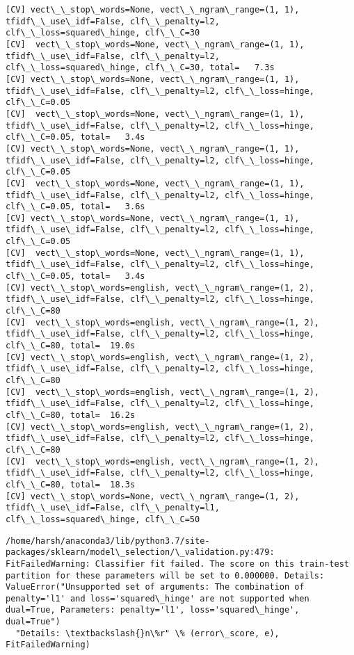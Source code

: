 \documentclass[11pt]{article}
\begin{document}
\begin{Verbatim}[commandchars=\\\{\}]
[CV] vect\_\_stop\_words=None, vect\_\_ngram\_range=(1, 1), tfidf\_\_use\_idf=False, clf\_\_penalty=l2, clf\_\_loss=squared\_hinge, clf\_\_C=30 
[CV]  vect\_\_stop\_words=None, vect\_\_ngram\_range=(1, 1), tfidf\_\_use\_idf=False, clf\_\_penalty=l2, clf\_\_loss=squared\_hinge, clf\_\_C=30, total=   7.3s
[CV] vect\_\_stop\_words=None, vect\_\_ngram\_range=(1, 1), tfidf\_\_use\_idf=False, clf\_\_penalty=l2, clf\_\_loss=hinge, clf\_\_C=0.05 
[CV]  vect\_\_stop\_words=None, vect\_\_ngram\_range=(1, 1), tfidf\_\_use\_idf=False, clf\_\_penalty=l2, clf\_\_loss=hinge, clf\_\_C=0.05, total=   3.4s
[CV] vect\_\_stop\_words=None, vect\_\_ngram\_range=(1, 1), tfidf\_\_use\_idf=False, clf\_\_penalty=l2, clf\_\_loss=hinge, clf\_\_C=0.05 
[CV]  vect\_\_stop\_words=None, vect\_\_ngram\_range=(1, 1), tfidf\_\_use\_idf=False, clf\_\_penalty=l2, clf\_\_loss=hinge, clf\_\_C=0.05, total=   3.6s
[CV] vect\_\_stop\_words=None, vect\_\_ngram\_range=(1, 1), tfidf\_\_use\_idf=False, clf\_\_penalty=l2, clf\_\_loss=hinge, clf\_\_C=0.05 
[CV]  vect\_\_stop\_words=None, vect\_\_ngram\_range=(1, 1), tfidf\_\_use\_idf=False, clf\_\_penalty=l2, clf\_\_loss=hinge, clf\_\_C=0.05, total=   3.4s
[CV] vect\_\_stop\_words=english, vect\_\_ngram\_range=(1, 2), tfidf\_\_use\_idf=False, clf\_\_penalty=l2, clf\_\_loss=hinge, clf\_\_C=80 
[CV]  vect\_\_stop\_words=english, vect\_\_ngram\_range=(1, 2), tfidf\_\_use\_idf=False, clf\_\_penalty=l2, clf\_\_loss=hinge, clf\_\_C=80, total=  19.0s
[CV] vect\_\_stop\_words=english, vect\_\_ngram\_range=(1, 2), tfidf\_\_use\_idf=False, clf\_\_penalty=l2, clf\_\_loss=hinge, clf\_\_C=80 
[CV]  vect\_\_stop\_words=english, vect\_\_ngram\_range=(1, 2), tfidf\_\_use\_idf=False, clf\_\_penalty=l2, clf\_\_loss=hinge, clf\_\_C=80, total=  16.2s
[CV] vect\_\_stop\_words=english, vect\_\_ngram\_range=(1, 2), tfidf\_\_use\_idf=False, clf\_\_penalty=l2, clf\_\_loss=hinge, clf\_\_C=80 
[CV]  vect\_\_stop\_words=english, vect\_\_ngram\_range=(1, 2), tfidf\_\_use\_idf=False, clf\_\_penalty=l2, clf\_\_loss=hinge, clf\_\_C=80, total=  18.3s
[CV] vect\_\_stop\_words=None, vect\_\_ngram\_range=(1, 2), tfidf\_\_use\_idf=False, clf\_\_penalty=l1, clf\_\_loss=squared\_hinge, clf\_\_C=50 

    \end{Verbatim}

    \begin{Verbatim}[commandchars=\\\{\}]
/home/harsh/anaconda3/lib/python3.7/site-packages/sklearn/model\_selection/\_validation.py:479: FitFailedWarning: Classifier fit failed. The score on this train-test partition for these parameters will be set to 0.000000. Details: 
ValueError("Unsupported set of arguments: The combination of penalty='l1' and loss='squared\_hinge' are not supported when dual=True, Parameters: penalty='l1', loss='squared\_hinge', dual=True")
  "Details: \textbackslash{}n\%r" \% (error\_score, e), FitFailedWarning)

    \end{Verbatim}
\end{document}
